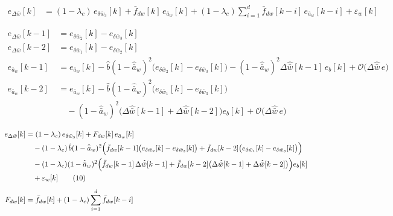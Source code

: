 \documentclass[11pt,a4paper,fontset=none]{ctexart}
\newcommand{\ba}{\bar{a}}
\newcommand{\bw}{\bar{w}}
\newcommand{\dWh}{\Delta\hat{\bw}}
\newcommand{\eD}{e_{\Delta\bw}}
\newcommand{\ah}{\hat{\ba}_w}
\newcommand{\bh}{\hat{b}}
\newcommand{\fd}{\bar f_{dw}}
\newcommand{\ea}{e_{\ba_w}}
\begin{document}
\begin{align*}
\eD[k] &= (1-\lambda_c)\,e_{\delta\bw_3}[k] + \fd[k]\,\ea[k] + (1-\lambda_c)\sum_{i=1}^{d}\fd[k-i]\,\ea[k-i] + \varepsilon_w[k] \tag{7}
\end{align*}

\begin{align*}
\eD[k-1] &= e_{\delta\bw_2}[k] - e_{\delta\bw_3}[k] \\
\eD[k-2] &= e_{\delta\bw_1}[k] - e_{\delta\bw_2}[k] \\[6pt]
\ea[k-1] &= \ea[k] - \bh(1-\ah)^{2}\bigl(e_{\delta\bw_2}[k] - e_{\delta\bw_3}[k]\bigr) - (1-\ah)^{2}\dWh[k-1]\,e_b[k]
            + \mathcal{O}\bigl(\dWh\,e\bigr) \tag{8} \\
\ea[k-2] &= \ea[k] - \bh(1-\ah)^{2}\bigl(e_{\delta\bw_1}[k] - e_{\delta\bw_3}[k]\bigr) \\
         &\quad - (1-\ah)^{2}\bigl(\dWh[k-1] + \dWh[k-2]\bigr)e_b[k] + \mathcal{O}\bigl(\dWh\,e\bigr) \tag{9}
\end{align*}

\begin{align*}
\eD[k] &= (1-\lambda_c)\,e_{\delta\bw_3}[k] + F_{dw}[k]\,\ea[k] \\
       &\quad - (1-\lambda_c)\,\bh(1-\ah)^{2}\Bigl(\fd[k-1]\bigl(e_{\delta\bw_2}[k] - e_{\delta\bw_3}[k]\bigr)
                 + \fd[k-2]\bigl(e_{\delta\bw_1}[k] - e_{\delta\bw_3}[k]\bigr)\Bigr) \\
       &\quad - (1-\lambda_c)(1-\ah)^{2}\Bigl(\fd[k-1]\,\dWh[k-1] + \fd[k-2]\bigl(\dWh[k-1] + \dWh[k-2]\bigr)\Bigr)e_b[k] \\
       &\quad + \varepsilon_w[k] \tag{10} \\[4pt]
F_{dw}[k] &= \fd[k] + (1-\lambda_c)\sum_{i=1}^{d}\fd[k-i]
\end{align*}
\end{document}
